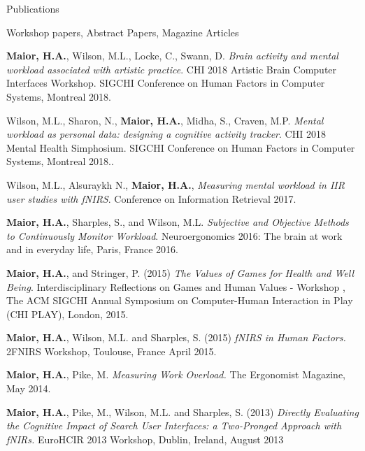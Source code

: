 \documentclass{resume} %
\begin{document}
\begin{rSection}{Publications}
\begin{rSubsection}{ }{ }{ }{Workshop papers, Abstract Papers, Magazine Articles}
	
	\item \textbf{Maior, H.A.}, Wilson, M.L., Locke, C., Swann, D.  \emph{Brain activity and mental workload associated with artistic practice}. CHI 2018 Artistic Brain Computer Interfaces Workshop. SIGCHI Conference on Human Factors in Computer Systems, Montreal 2018.
	\item Wilson, M.L., Sharon, N., \textbf{Maior, H.A.}, Midha, S., Craven, M.P.  \emph{Mental workload as personal data: designing a cognitive activity tracker}. CHI 2018 Mental Health Simphosium. SIGCHI Conference on Human Factors in Computer Systems, Montreal 2018..
	\item Wilson, M.L., Alsuraykh N., \textbf{Maior, H.A.},  \emph{Measuring mental workload in IIR user studies with fNIRS}. Conference on Information Retrieval 2017.
	\item \textbf{Maior, H.A.}, Sharples, S., and Wilson, M.L. \emph{Subjective and Objective Methods to Continuously Monitor Workload}. Neuroergonomics 2016: The brain at work and in everyday life, Paris, France 2016.
    \item \textbf{Maior, H.A.}, and Stringer, P. (2015) \emph{The Values of Games for Health and Well Being}. Interdisciplinary Reflections on Games and Human Values - Workshop , The ACM SIGCHI Annual Symposium on Computer-Human Interaction in Play (CHI PLAY), London, 2015.
    \item \textbf{Maior, H.A.}, Wilson, M.L. and Sharples, S. (2015) \emph{fNIRS in Human Factors.} 2FNIRS Workshop, Toulouse, France April 2015.
    \item \textbf{Maior, H.A.}, Pike, M. \emph{Measuring Work Overload.} The Ergonomist Magazine, May 2014.
    \item \textbf{Maior, H.A.}, Pike, M., Wilson, M.L. and Sharples, S. (2013) \emph{Directly Evaluating the Cognitive Impact of Search User Interfaces: a Two-Pronged Approach with fNIRs.} EuroHCIR 2013 Workshop, Dublin, Ireland, August 2013
\end{rSubsection}

\end{rSection}
\vspace{-2 mm}

\end{document}
